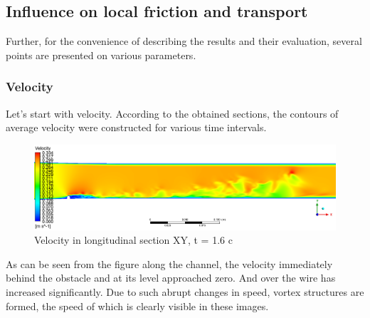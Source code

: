 \subsection{Influence on local friction and transport}
	Further, for the convenience of describing the results and their evaluation, several points are presented on various parameters.
\subsubsection{Velocity}
	Let's start with velocity. According to the obtained sections, the contours of average velocity were constructed for various time intervals.
	\begin{figure}[H]
		\centering
		\includegraphics[width=1\linewidth]{../Assets/T16_Velocity_ContourXY}
		\caption{Velocity in longitudinal section XY, t = 1.6 c}
		\label{fig:t16velocitycontourxy}
	\end{figure}
	As can be seen from the figure along the channel, the velocity immediately behind the obstacle and at its level approached zero. And over the wire has increased significantly. Due to such abrupt changes in speed, vortex structures are formed, the speed of which is clearly visible in these images.
	
